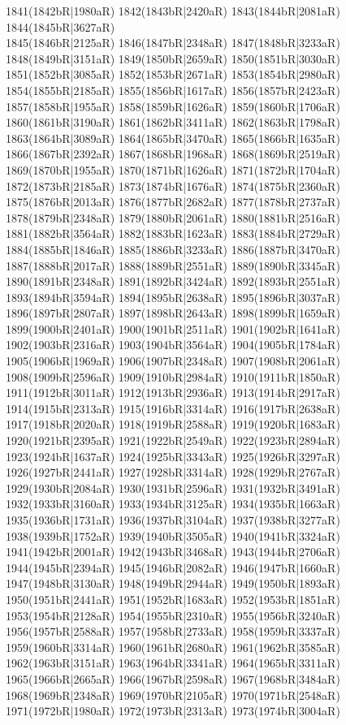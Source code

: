 1841(1842bR|1980aR) 1842(1843bR|2420aR) 1843(1844bR|2081aR) 1844(1845bR|3627aR) \\1845(1846bR|2125aR) 1846(1847bR|2348aR) 1847(1848bR|3233aR) 1848(1849bR|3151aR) 1849(1850bR|2659aR) 1850(1851bR|3030aR) 1851(1852bR|3085aR) 1852(1853bR|2671aR) 1853(1854bR|2980aR) \\1854(1855bR|2185aR) 1855(1856bR|1617aR) 1856(1857bR|2423aR) 1857(1858bR|1955aR) 1858(1859bR|1626aR) 1859(1860bR|1706aR) 1860(1861bR|3190aR) 1861(1862bR|3411aR) 1862(1863bR|1798aR) \\1863(1864bR|3089aR) 1864(1865bR|3470aR) 1865(1866bR|1635aR) 1866(1867bR|2392aR) 1867(1868bR|1968aR) 1868(1869bR|2519aR) 1869(1870bR|1955aR) 1870(1871bR|1626aR) 1871(1872bR|1704aR) \\1872(1873bR|2185aR) 1873(1874bR|1676aR) 1874(1875bR|2360aR) 1875(1876bR|2013aR) 1876(1877bR|2682aR) 1877(1878bR|2737aR) 1878(1879bR|2348aR) 1879(1880bR|2061aR) 1880(1881bR|2516aR) \\1881(1882bR|3564aR) 1882(1883bR|1623aR) 1883(1884bR|2729aR) 1884(1885bR|1846aR) 1885(1886bR|3233aR) 1886(1887bR|3470aR) 1887(1888bR|2017aR) 1888(1889bR|2551aR) 1889(1890bR|3345aR) \\1890(1891bR|2348aR) 1891(1892bR|3424aR) 1892(1893bR|2551aR) 1893(1894bR|3594aR) 1894(1895bR|2638aR) 1895(1896bR|3037aR) 1896(1897bR|2807aR) 1897(1898bR|2643aR) 1898(1899bR|1659aR) \\1899(1900bR|2401aR) 1900(1901bR|2511aR) 1901(1902bR|1641aR) 1902(1903bR|2316aR) 1903(1904bR|3564aR) 1904(1905bR|1784aR) 1905(1906bR|1969aR) 1906(1907bR|2348aR) 1907(1908bR|2061aR) \\1908(1909bR|2596aR) 1909(1910bR|2984aR) 1910(1911bR|1850aR) 1911(1912bR|3011aR) 1912(1913bR|2936aR) 1913(1914bR|2917aR) 1914(1915bR|2313aR) 1915(1916bR|3314aR) 1916(1917bR|2638aR) \\1917(1918bR|2020aR) 1918(1919bR|2588aR) 1919(1920bR|1683aR) 1920(1921bR|2395aR) 1921(1922bR|2549aR) 1922(1923bR|2894aR) 1923(1924bR|1637aR) 1924(1925bR|3343aR) 1925(1926bR|3297aR) \\1926(1927bR|2441aR) 1927(1928bR|3314aR) 1928(1929bR|2767aR) 1929(1930bR|2084aR) 1930(1931bR|2596aR) 1931(1932bR|3491aR) 1932(1933bR|3160aR) 1933(1934bR|3125aR) 1934(1935bR|1663aR) \\1935(1936bR|1731aR) 1936(1937bR|3104aR) 1937(1938bR|3277aR) 1938(1939bR|1752aR) 1939(1940bR|3505aR) 1940(1941bR|3324aR) 1941(1942bR|2001aR) 1942(1943bR|3468aR) 1943(1944bR|2706aR) \\1944(1945bR|2394aR) 1945(1946bR|2082aR) 1946(1947bR|1660aR) 1947(1948bR|3130aR) 1948(1949bR|2944aR) 1949(1950bR|1893aR) 1950(1951bR|2441aR) 1951(1952bR|1683aR) 1952(1953bR|1851aR) \\1953(1954bR|2128aR) 1954(1955bR|2310aR) 1955(1956bR|3240aR) 1956(1957bR|2588aR) 1957(1958bR|2733aR) 1958(1959bR|3337aR) 1959(1960bR|3314aR) 1960(1961bR|2680aR) 1961(1962bR|3585aR) \\1962(1963bR|3151aR) 1963(1964bR|3341aR) 1964(1965bR|3311aR) 1965(1966bR|2665aR) 1966(1967bR|2598aR) 1967(1968bR|3484aR) 1968(1969bR|2348aR) 1969(1970bR|2105aR) 1970(1971bR|2548aR) \\1971(1972bR|1980aR) 1972(1973bR|2313aR) 1973(1974bR|3004aR) 